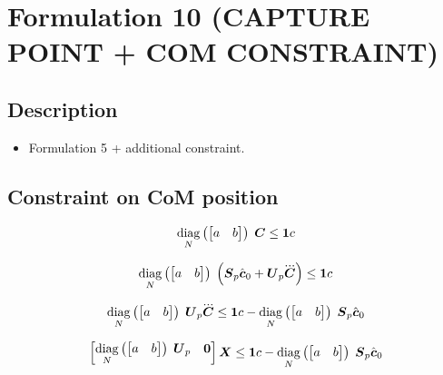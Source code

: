 \section{Formulation 10 (CAPTURE POINT + COM CONSTRAINT)}\label{sec.form07}


\subsection{Description}
\begin{itemize}
    \item Formulation 5 + additional constraint.
\end{itemize}



\subsection{Constraint on CoM position}

\begin{equation*}
    \underset{N}{\operatorname{diag}}\left(\begin{bmatrix} a & b \end{bmatrix}\right)\; \mbox{\boldmath $C$}  \le  \mbox{\boldmath $1$} c
\end{equation*}

\begin{equation*}
    \diag{N}{\begin{bmatrix} a & b \end{bmatrix}}
    \left(
        \M{S}_{p} \cstate_0 + \M{U}_{p} \cJerk
    \right)
    \le
    \M{1} c
\end{equation*}


\begin{equation*}
    \diag{N}{\begin{bmatrix} a & b \end{bmatrix}}
    \M{U}_{p} \cJerk
    \le
    \M{1} c 
    -
    \diag{N}{\begin{bmatrix} a & b \end{bmatrix}} \M{S}_{p} \cstate_0
\end{equation*}


\begin{equation*}
    \begin{bmatrix}
        \underset{N}{\operatorname{diag}}\left(\begin{bmatrix} a & b \end{bmatrix}\right)\; \mbox{\boldmath $U$}_{p}     &   \mbox{\boldmath $0$} 
    \end{bmatrix}
    \mbox{\boldmath $X$}
    \le
    \mbox{\boldmath $1$} c 
    -
    \underset{N}{\operatorname{diag}}\left(\begin{bmatrix} a & b \end{bmatrix}\right)\; \mbox{\boldmath $S$}_{p} \hat{\mbox{\boldmath $c$}}_0
\end{equation*}
